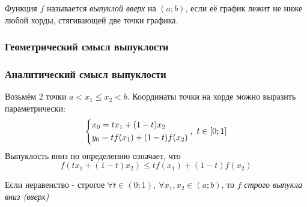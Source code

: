 \begin{definition}
	Функция $f$ называется \textit{выпуклой вверх} на $(a; b)$, если её график лежит не ниже любой хорды, стягивающей две точки графика.
\end{definition}

\subsubsection*{Геометрический смысл выпуклости}


\subsubsection*{Аналитический смысл выпуклости}

Возьмём 2 точки $a < x_1 \le x_2 < b$. Координаты точки на хорде можно выразить параметрически:
\[
	\left\{\begin{aligned}
		&x_0 = tx_1 + (1 - t)x_2
		\\
		&y_0 = tf(x_1) + (1 - t)f(x_2)
	\end{aligned}\right.
	,\ t \in [0; 1]
\]
Выпуклость вниз по определению означает, что
\[
	f(tx_1 + (1 - t)x_2) \le tf(x_1) + (1 - t)f(x_2)
\]

\begin{note}
	Если неравенство - строгое $\forall t \in (0; 1),\ \forall x_1, x_2 \in (a; b)$, то $f$ \textit{строго выпукла вниз (вверх)}
\end{note}